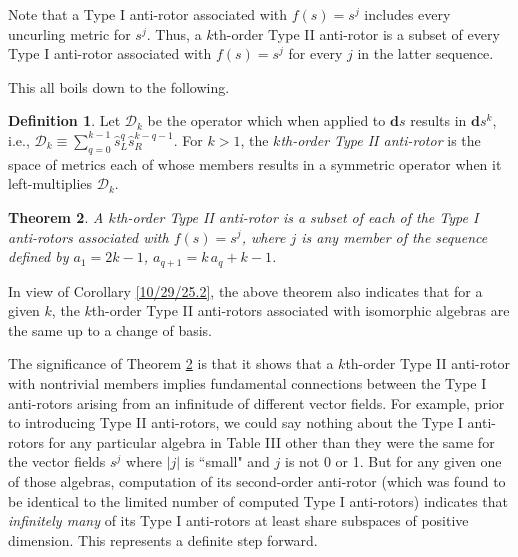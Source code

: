 \documentclass{amsart}
\newtheorem{theorem}{Theorem}
\theoremstyle{definition}
\newtheorem{definition}[theorem]{Definition}
\numberwithin{theorem}{section}
\numberwithin{equation}{section}
\begin{document}
 Note that a Type I anti-rotor associated with $f(s)=s^j$ includes every uncurling metric for $s^j$.  Thus, a $k$th-order Type II anti-rotor is a subset of every Type I anti-rotor associated with $f(s)=s^j$ for every $j$ in the latter sequence.
  
  This all boils down to the following.
 
\begin{definition}\label{10/29/25.3} Let $\mathcal{D}_k$ be the operator which when applied to $\mathbf{d}s$ results in $\mathbf{d}s^k$, i.e., $\mathcal{D}_k \equiv \sum_{q=0}^{k-1} \hat{s}_L^q\hat{s}_R^{k-q-1}$.   For $k>1$, the {\it $k$th-order Type II anti-rotor} is the space of metrics each of whose members results in a symmetric operator when it left-multiplies $\mathcal{D}_k$.\end{definition}

\begin{theorem}\label{10/29/25.4} A $k$th-order Type II anti-rotor is a subset of each of the Type I anti-rotors associated with $f(s)=s^j$, where $j$ is any member of the sequence defined by $a_1=2k-1$, $a_{q+1} = k\, a_q +k-1$. \end{theorem}

In view of Corollary \ref{10/29/25.2}, the above theorem also indicates that for a given $k$, the $k$th-order Type II anti-rotors associated with isomorphic algebras are the same up to a change of basis.

The significance of Theorem \ref{10/29/25.4} is that it shows that a $k$th-order Type II anti-rotor with nontrivial members implies fundamental connections between the Type I anti-rotors arising from an infinitude of different vector fields.  For example, prior to introducing Type II anti-rotors, we could say nothing about the Type I anti-rotors for any particular algebra in Table III other than they were the same for the vector fields $s^j$ where $|j|$ is ``small" and $j$ is not 0 or 1.  But for any given one of those algebras, computation of its second-order anti-rotor (which was found to be identical to the limited number of computed Type I anti-rotors) indicates that {\it infinitely many} of its Type I anti-rotors at least share subspaces of positive dimension.  This represents a definite step forward.
\end{document}
